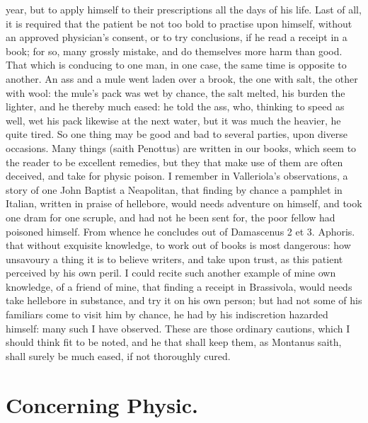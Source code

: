 {year, but to apply himself to their prescriptions all the days of his
life. Last of all, it is required that the patient be not too bold to
practise upon himself, without an approved physician's consent, or to
try conclusions, if he read a receipt in a book; for so, many grossly
mistake, and do themselves more harm than good. That which is conducing
to one man, in one case, the same time is opposite to another. An
ass and a mule went laden over a brook, the one with salt, the other
with wool: the mule's pack was wet by chance, the salt melted, his
burden the lighter, and he thereby much eased: he told the ass, who,
thinking to speed as well, wet his pack likewise at the next water, but
it was much the heavier, he quite tired. So one thing may be good and
bad to several parties, upon diverse occasions. Many things (saith
 Penottus) are written in our books, which seem to the reader to
be excellent remedies, but they that make use of them are often
deceived, and take for physic poison. I remember in Valleriola's
observations, a story of one John Baptist a Neapolitan, that finding by
chance a pamphlet in Italian, written in praise of hellebore, would
needs adventure on himself, and took one dram for one scruple, and had
not he been sent for, the poor fellow had poisoned himself. From whence
he concludes out of Damascenus 2 et 3. Aphoris. that without
exquisite knowledge, to work out of books is most dangerous: how
unsavoury a thing it is to believe writers, and take upon trust, as
this patient perceived by his own peril. I could recite such another
example of mine own knowledge, of a friend of mine, that finding a
receipt in Brassivola, would needs take hellebore in substance, and try
it on his own person; but had not some of his familiars come to visit
him by chance, he had by his indiscretion hazarded himself: many such I
have observed. These are those ordinary cautions, which I should think
fit to be noted, and he that shall keep them, as  Montanus saith,
shall surely be much eased, if not thoroughly cured.

\section{Concerning Physic.}

}
